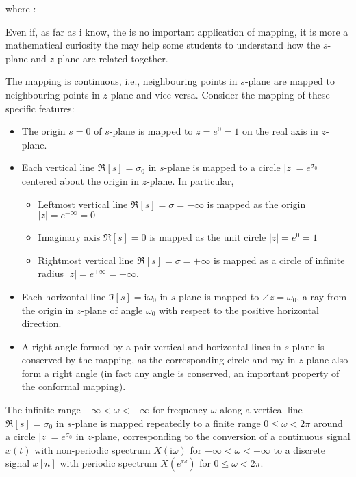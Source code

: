 	where :
	
	Even if, as far as i know, the is no important application of mapping, it is more a mathematical curiosity the may help some students to understand how the $s$-plane and $z$-plane are related together.
	
	The mapping is continuous, i.e., neighbouring points in $s$-plane are mapped to neighbouring points in $z$-plane and vice versa. Consider the mapping of these specific features: 
	\begin{itemize}
		\item The origin $s=0$ of $s$-plane is mapped to $z=e^0=1$ on the real axis in $z$-plane.
		\item Each vertical line $\Re[s]=\sigma_0$ in $s$-plane is mapped to a circle $|z|=e^{\sigma_0}$ centered about the origin in $z$-plane. In particular,
			\begin{itemize}
			\item Leftmost vertical line $\Re[s]=\sigma=-\infty$ is mapped as the origin $|z|=e^{-\infty}=0$
			\item Imaginary axis $\Re[s]=0$ is mapped as the unit circle $|z|=e^0=1$
			\item Rightmost vertical line $\Re[s]=\sigma={+\infty}$ is mapped as a circle of infinite radius $|z|=e^{{+\infty}}={+\infty}$.
			\end{itemize}
		\item Each horizontal line $\Im[s]=\mathrm{i}\omega_0$ in $s$-plane is mapped to $\angle{z}=\omega_0$, a ray from the origin in $z$-plane of angle $\omega_0$ with respect to the positive horizontal direction. 
		\item A right angle formed by a pair vertical and horizontal lines in $s$-plane is conserved by the mapping, as the corresponding circle and ray in $z$-plane also form a right angle (in fact any angle is conserved, an important property of the conformal mapping).
	\end{itemize}
	The infinite range $-\infty < \omega < {+\infty}$ for frequency $\omega$ along a vertical line $\Re[s]=\sigma_0$ in $s$-plane is mapped repeatedly to a finite range $0 \le \omega < 2\pi$ around a circle $|z|=e^{\sigma_0}$ in $z$-plane, corresponding to the conversion of a continuous signal $x(t)$ with non-periodic spectrum $X(\mathrm{i}\omega)$ for $-\infty < \omega < {+\infty}$ to a discrete signal $x[n]$ with periodic spectrum $X(e^{\mathrm{i}\omega})$ for $0 \le \omega < 2\pi$.
	
